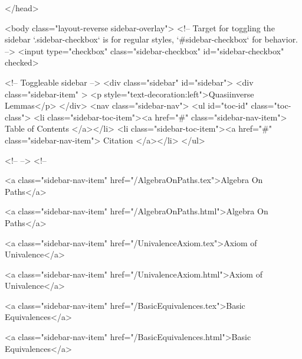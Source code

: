   
</head>




  <body class="layout-reverse sidebar-overlay">
    <!-- Target for toggling the sidebar `.sidebar-checkbox` is for regular
     styles, `#sidebar-checkbox` for behavior. -->
<input type="checkbox" class="sidebar-checkbox" id="sidebar-checkbox" checked>

<!-- Toggleable sidebar -->
<div class="sidebar" id="sidebar">
  <div class="sidebar-item" >
    <p style="text-decoration:left">Quasiinverse Lemmas</p>
  </div>
  <nav class="sidebar-nav">
    <ul id="toc-id" class="toc-class">
  <li class="sidebar-toc-item"><a href="#" class="sidebar-nav-item"> Table of Contents </a></li>
  <li class="sidebar-toc-item"><a href="#" class="sidebar-nav-item"> Citation </a></li>
</ul>


    <!--  -->
    <!-- 
      
    
      
    
      
    
      
    
      
        
      
    
      
        
          <a class="sidebar-nav-item" href="/AlgebraOnPaths.tex">Algebra On Paths</a>
        
      
    
      
        
          <a class="sidebar-nav-item" href="/AlgebraOnPaths.html">Algebra On Paths</a>
        
      
    
      
        
          <a class="sidebar-nav-item" href="/UnivalenceAxiom.tex">Axiom of Univalence</a>
        
      
    
      
        
          <a class="sidebar-nav-item" href="/UnivalenceAxiom.html">Axiom of Univalence</a>
        
      
    
      
        
          <a class="sidebar-nav-item" href="/BasicEquivalences.tex">Basic Equivalences</a>
        
      
    
      
        
          <a class="sidebar-nav-item" href="/BasicEquivalences.html">Basic Equivalences</a>
        

